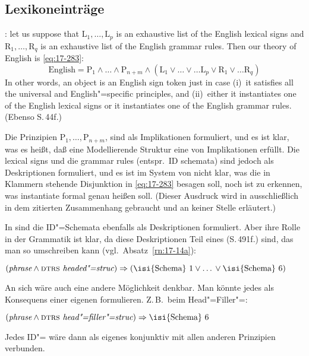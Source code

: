 \documentclass[output=paper]{LSP/langsci}
\begin{document}
\subsection{Lexikoneinträge}
\randnum\label{rn:17-4}\citet[147]{PollardSag1987}: {\glqq}let us suppose that $\mathrm{L}_1,
{\ldots},
\mathrm{L}_p$ is an exhaustive list of the English lexical signs and
$\mathrm{R}_1, {\ldots},
\mathrm{R}_q$ is an exhaustive list of the English grammar rules. Then
our theory of English is \eqref{eq:17-283}:
\begin{equation}
\label{eq:17-283}
\tag{283}
\textrm{English} = \mathrm{P}_1 \wedge {\ldots} \wedge \mathrm{P}_{n+m} \wedge (\mathrm{L}_1 \vee
\ldots{} \vee \ldots{} \mathrm{L}_p \vee \mathrm{R}_1 \vee \ldots{} \mathrm{R}_q)
\end{equation}
In other words, an object is an English sign token just in case (i)~it satisfies all the universal and English"=specific principles, and (ii)~either it instantiates one of the English lexical signs or it
instantiates one of the English grammar rules.{\grqq} (Ebenso S.\,44f.)

\randnum\label{rn:17-6}Die Prinzipien $\mathrm{P}_1, \ldots{}, \mathrm{P}_{n+m}$, sind als Implikationen formuliert, und es ist klar, was es heißt, daß eine Modellierende Struktur eine  von Implikationen erfüllt. Die lexical signs und die grammar rules (entspr.\ ID schemata) sind jedoch als Deskriptionen formuliert, und es ist im System von \citet{PollardSag1994} nicht klar, was die in Klammern stehende Disjunktion in \eqref{eq:17-283} besagen soll, noch ist zu erkennen, was {\glqq}instantiate{\grqq} formal genau heißen soll. (Dieser Ausdruck wird in \citet{PollardSag1987} ausschließlich in dem zitierten
Zusammenhang gebraucht und an keiner Stelle erläutert.)

\randnum\label{rn:17-7}In \citet{PollardSag1994} sind die ID"=Schemata ebenfalls als Deskriptionen
formuliert. Aber ihre Rolle in der Grammatik ist klar, da diese
Deskriptionen Teil eines  (S.\,491f.) sind, das man so
umschreiben kann (vgl.\ Absatz~\ref{rn:17-14a}):
\begin{exe}
\ex
$(\textit{phrase} \wedge \textsc{dtrs} \textit{ headed"=struc}) \Rightarrow (\textrm{\isi{Schema}
} 1 \vee \ldots{} \vee \textrm{\isi{Schema} } 6)$
\end{exe}

\randnum\label{rn:17-9}An sich wäre auch eine andere Möglichkeit denkbar. Man könnte jedes
 als Konsequens einer eigenen  formulieren. Z.\,B.\ beim
Head"=Filler"=:
\begin{exe}
\ex
$(\textit{phrase} \wedge \textsc{dtrs} \textit{ head"=filler"=struc}) \Rightarrow \textrm{\isi{Schema} } 6$
\end{exe}
\randnum\label{rn:17-11}Jedes ID"= wäre dann als eigenes  konjunktiv mit allen
anderen Prinzipien verbunden.
\end{document}

